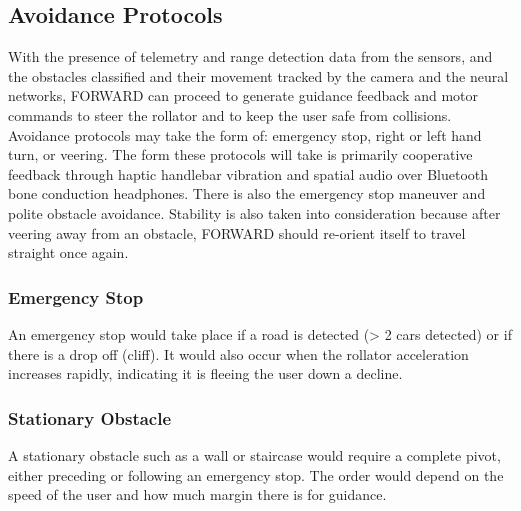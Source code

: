 \subsection{Avoidance Protocols}
\noindent With the presence of telemetry and range detection data from the sensors, and the obstacles classified and their movement tracked by the camera and the neural networks, FORWARD can proceed to generate guidance feedback and motor commands to steer the rollator and to keep the user safe from collisions. Avoidance protocols may take the form of: emergency stop, right or left hand turn, or veering. The form these protocols will take is primarily cooperative feedback through haptic handlebar vibration and spatial audio over Bluetooth bone conduction headphones. There is also the emergency stop maneuver and polite obstacle avoidance. Stability is also taken into consideration because after veering away from an obstacle, FORWARD should re-orient itself to travel straight once again.\\

\subsubsection{Emergency Stop}
\noindent An emergency stop would take place if a road is detected (> 2 cars detected) or if there is a drop off (cliff). It would also occur when the rollator acceleration increases rapidly, indicating it is fleeing the user down a decline.\\

\subsubsection{Stationary Obstacle}
\noindent A stationary obstacle such as a wall or staircase would require a complete pivot, either preceding or following an emergency stop. The order would depend on the speed of the user and how much margin there is for guidance.\\



